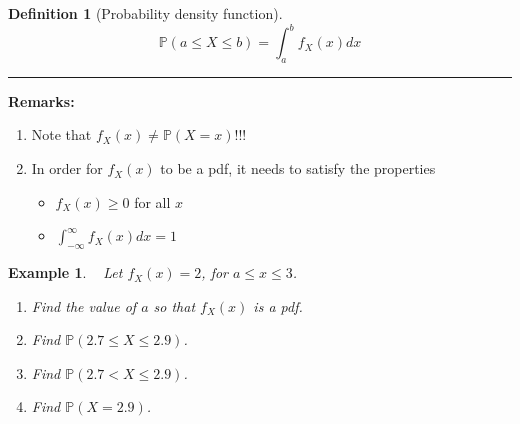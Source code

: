 \documentclass[12pt]{amsart}
\newtheorem{definition}[theorem]{Definition}
\newtheorem{example}[theorem]{Example}
\newcommand\Pbb{\mathbb{P}}
\newcommand\pdfX{f_X(x)}
\begin{document}
{\begin{definition}[Probability density function]
$$
\mathbb{P}(a \leq X \leq b) = \int_a^b f_X(x)dx
$$


\end{definition}
\vspace{.5cm}
\hrule
\vspace{.5cm}

\textbf{Remarks:}
\begin{enumerate}
\item Note that $f_X(x) \neq \mathbb{P}(X=x)$!!!
\vspace{.5cm}
\item In order for $f_X(x)$ to be a pdf, it needs to satisfy the properties 
	\begin{itemize}
	\item $f_X(x) \geq 0$ for all $x$
	\item $\int_{-\infty}^{\infty} f_X(x)dx=1$
	\end{itemize}
\end{enumerate}


\newpage

\begin{example}\ %
Let $\pdfX = 2$, for $a \leq x \leq 3$.

\begin{enumerate}

\item Find the value of $a$ so that $\pdfX$ is a pdf.

\vspace{5cm}

\item Find $\Pbb(2.7 \leq X \leq 2.9)$.

\vspace{5cm}

\item Find $\Pbb(2.7 < X \leq 2.9)$.

\vspace{4cm}

\item Find $\Pbb(X = 2.9)$.

\vspace{4cm}


\end{enumerate}
\end{example}}
\end{document}
